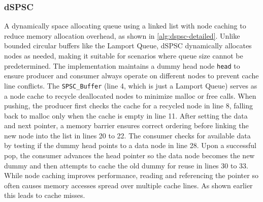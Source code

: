 \subsubsection{\acf{dSPSC}}
A dynamically space allocating queue using a linked list with node caching to reduce memory allocation overhead, as shown in \cref{alg:dspsc-detailed}. Unlike bounded circular buffers like the Lamport Queue, dSPSC dynamically allocates nodes as needed, making it suitable for scenarios where queue size cannot be predetermined. The implementation maintains a dummy head node \texttt{head} to ensure producer and consumer always operate on different nodes to prevent cache line conflicts. The \texttt{SPSC\_Buffer} (line 4, which is just a Lamport Queue) serves as a node cache to recycle deallocated nodes to minimize malloc or free calls. When pushing, the producer first checks the cache for a recycled node in line 8, falling back to malloc only when the cache is empty in line 11. After setting the data and next pointer, a memory barrier ensures correct ordering before linking the new node into the list in lines 20 to 22. The consumer checks for available data by testing if the dummy head points to a data node in line 28. Upon a successful pop, the consumer advances the head pointer so the data node becomes the new dummy and then attempts to cache the old dummy for reuse in lines 30 to 33. While node caching improves performance, reading and referencing the pointer so often causes memory accesses spread over multiple cache lines. As shown earlier this leads to cache misses. \cite{torquati2010singleproducersingleconsumerqueuessharedcache}


